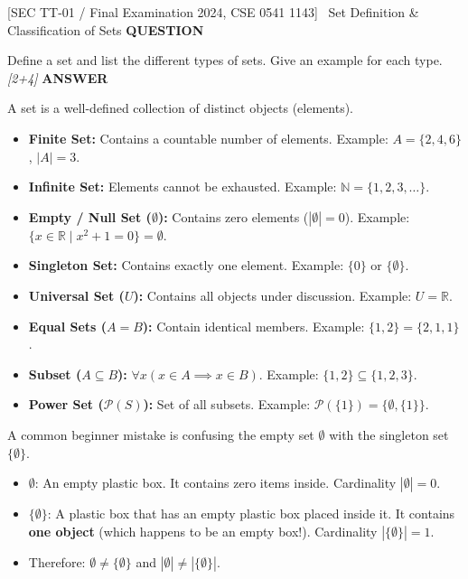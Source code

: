\documentclass[11pt,a4paper]{article}
\newcommand{\Qlabel}{\textbf{\color{navy}\footnotesize\MakeUppercase{Question}}\par\smallskip}
\newcommand{\Alabel}{\textbf{\color{teal}\footnotesize\MakeUppercase{Answer}}\par\smallskip}
\begin{document}
\begin{exambox}{[SEC TT-01 / Final Examination 2024, CSE 0541 1143] \ Set Definition \& Classification of Sets}
\Qlabel
Define a set and list the different types of sets. Give an example for each type. \hfill\textit{[2+4]}
\tcblower
\Alabel
A set is a well-defined collection of distinct objects (elements).
\begin{itemize}
    \item \textbf{Finite Set:} Contains a countable number of elements. Example: $A = \{2, 4, 6\}$, $|A| = 3$.
    \item \textbf{Infinite Set:} Elements cannot be exhausted. Example: $\mathbb{N} = \{1, 2, 3, \dots\}$.
    \item \textbf{Empty / Null Set ($\emptyset$):} Contains zero elements ($|\emptyset| = 0$). Example: $\{x \in \mathbb{R} \mid x^2 + 1 = 0\} = \emptyset$.
    \item \textbf{Singleton Set:} Contains exactly one element. Example: $\{0\}$ or $\{\emptyset\}$.
    \item \textbf{Universal Set ($U$):} Contains all objects under discussion. Example: $U = \mathbb{R}$.
    \item \textbf{Equal Sets ($A = B$):} Contain identical members. Example: $\{1, 2\} = \{2, 1, 1\}$.
    \item \textbf{Subset ($A \subseteq B$):} $\forall x (x \in A \implies x \in B)$. Example: $\{1, 2\} \subseteq \{1, 2, 3\}$.
    \item \textbf{Power Set ($\mathcal{P}(S)$):} Set of all subsets. Example: $\mathcal{P}(\{1\}) = \{\emptyset, \{1\}\}$.
\end{itemize}
\end{exambox}

\begin{warningbox}
A common beginner mistake is confusing the empty set $\emptyset$ with the singleton set $\{\emptyset\}$.
\begin{itemize}
    \item $\mathbf{\emptyset}$: An empty plastic box. It contains zero items inside. Cardinality $|\emptyset| = 0$.
    \item $\mathbf{\{\emptyset\}}$: A plastic box that has an empty plastic box placed inside it. It contains \textbf{one object} (which happens to be an empty box!). Cardinality $|\{\emptyset\}| = 1$.
    \item Therefore: $\mathbf{\emptyset \neq \{\emptyset\}}$ and $|\emptyset| \neq |\{\emptyset\}|$.
\end{itemize}
\end{warningbox}
\end{document}
